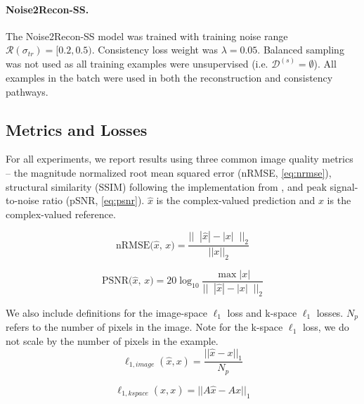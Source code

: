 \documentclass[10pt,twocolumn,letterpaper]{article}
\newcommand{\noiserange}{\mathcal{R}(\sigma_{tr})}
\begin{document}
\paragraph{Noise2Recon-SS.} The Noise2Recon-SS model was trained with training noise range $\noiserange=[0.2,0.5)$. Consistency loss weight was $\lambda=0.05$. Balanced sampling was not used as all training examples were unsupervised (i.e. $\mathcal{D}^{(s)}=\emptyset$). All examples in the batch were used in both the reconstruction and consistency pathways.

\subsection{Metrics and Losses}
For all experiments, we report results using three common image quality metrics -- the magnitude normalized root mean squared error (nRMSE, \cref{eq:nrmse}), structural similarity (SSIM) following the implementation from \cite{wang2004image}, and peak signal-to-noise ratio (pSNR, \cref{eq:psnr}). $\hat{x}$ is the complex-valued prediction and $x$ is the complex-valued reference.

\begin{equation}
\label{eq:nrmse}
    \text{nRMSE($\hat{x}$, $x$)} = \frac{||\;\;|\hat{x}| - |x|\;\;||_2}{||x||_2}
\end{equation}

\begin{equation}
\label{eq:psnr}
    \text{PSNR($\hat{x}$, $x$)} = 20\log_{10} \frac{\max |x|}{||\;\;|\hat{x}| - |x|\;\;||_2}
\end{equation}

We also include definitions for the image-space $\ell_1$ loss and k-space $\ell_1$ losses. $N_p$ refers to the number of pixels in the image. Note for the k-space $\ell_1$ loss, we do not scale by the number of pixels in the example.
\begin{equation}
\label{eq:l1-image-loss}
    \ell_{1, image}(\hat{x}, x) = \frac{||\hat{x} - x||_1}{N_p}
\end{equation}

\begin{equation}
\label{eq:l1-kspace-loss}
    \ell_{1, kspace}(\hat{x}, x) = ||A\hat{x} - Ax||_1
\end{equation}
\end{document}
